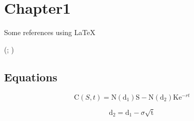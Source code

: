 \section{Chapter1}
	\label{sec:chapter1}

	Some references using \LaTeX

	\citet{de1998little}

	\citet[p.~34]{de1998little}

	\citep{de1998little}

	\citep[p.~34]{de1998little}

	\citep{de1998little,bieger2013}

	(\citealp[p.~3]{de1998little}; \citealp[p.~5]{bieger2013})

	\citep[e.g.][p.~34]{de1998little}



\subsection{Equations}
	\label{subsec:equ}


	\begin{equation}
	\mathrm C( S, t)= \mathrm N(\mathrm d_1)\mathrm S - \mathrm N(\mathrm d_2) \mathrm K \mathrm e^{-rt}
	\label{eq:1}
	\end{equation}

	\begin{equation}
	\mathrm d_2= \mathrm d_1 - \sigma \sqrt{\mathrm t}
	\label{eq:3}
	\end{equation}

	\newpage
